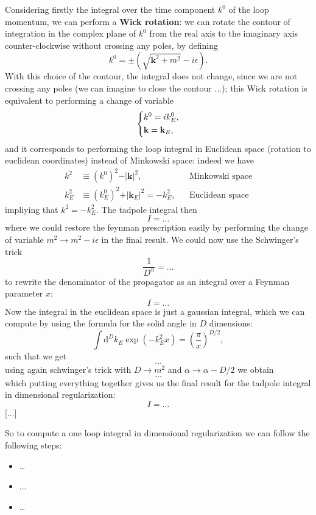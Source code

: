 Considering firstly the integral over the time component \(k^0\) of the loop momentum, we can perform a \textbf{Wick rotation}: we can rotate the contour of integration in the complex plane of \(k^0\) from the real axis to the imaginary axis counter-clockwise without crossing any poles, by defining
\[
    k^0 = \pm (\sqrt{\mathbf{k}^2 + m^2} - i \epsilon).
\]
With this choice of the contour, the integral does not change, since we are not crossing any poles (we can imagine to close the contour ...); this Wick rotation is equivalent to performing a change of variable
\[
    \begin{dcases}
        k^0 = i k_E^0, \\
        \mathbf{k} = \mathbf{k}_E,
    \end{dcases}
\]
and it corresponds to performing the loop integral in Euclidean space (rotation to euclidean coordinates) instead of Minkowski space: indeed we have
\[
    \begin{aligned}
        k^2   & \equiv (k^0)^2 - \vert \mathbf{k} \vert^2,              &  & \text{Minkowski space} \\
        k_E^2 & \equiv (k_E^0)^2 +\vert \mathbf{k}_E \vert^2 = - k_E^2, &  & \text{Euclidean space}
    \end{aligned}
\]
impliying that \(k^2 = - k_E^2\). The tadpole integral then
\[
    I = \dots
\]
where we could restore the feynman prescription easily by performing the change of variable \(m^2 \to m^2 - i \epsilon\) in the final result. We could now use the Schwinger's trick
\[
    \frac{1}{D^{\alpha}} = \dots
\]
to rewrite the denominator of the propagator as an integral over a Feynman parameter \(x\):
\[
    I = \dots
\]
Now the integral in the euclidean space is just a gaussian integral, which we can compute by using the formula for the solid angle in \(D\) dimensions:
\[
    \int \mathrm{d}^D k_E \exp(-k_E^2 x) = \left(\frac{\pi}{x}\right)^{D/2},
\]
such that we get
\[
    \dots
\]
using again schwinger's trick with \(D \to m^2\) and \(\alpha \to \alpha - D/2\) we obtain
\[
    \dots
\]
which putting everything together gives us the final result for the tadpole integral in dimensional regularization:
\[
    I = \dots
\]
[...]

So to compute a one loop integral in dimensional regularization we can follow the following steps:
\begin{itemize}
    \item \dots
    \item ...
    \item \dots
\end{itemize}

